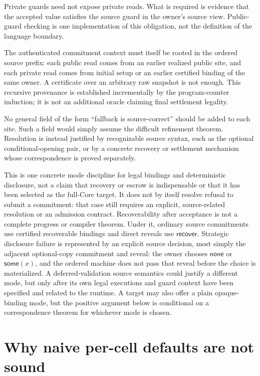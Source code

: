 \documentclass[11pt]{article}
\newcommand{\Some}{\mathsf{some}}
\newcommand{\None}{\mathsf{none}}
\begin{document}
Private guards need not expose private reads.  What is required is evidence
that the accepted value satisfies the source guard in the owner's source view.
Public-guard checking is one implementation of this obligation, not the
definition of the language boundary.

The authenticated commitment context must itself be rooted in the ordered
source prefix: each public read comes from an earlier realized public site, and
each private read comes from initial setup or an earlier certified binding of
the same owner.  A certificate over an arbitrary raw snapshot is not enough.
This recursive provenance is established incrementally by the program-counter
induction; it is not an additional oracle claiming final settlement legality.

No general field of the form ``fallback is source-correct'' should be added to
each site.  Such a field would simply assume the difficult refinement theorem.
Resolution is instead justified by recognizable source syntax, such as the
optional conditional-opening pair, or by a concrete recovery or settlement
mechanism whose correspondence is proved separately.

This is one concrete mode discipline for legal bindings and deterministic
disclosure, not a claim that recovery or escrow is indispensable or that it has
been selected as the full-Core target.  It does not by itself resolve refusal
to submit a commitment: that case still requires an explicit, source-related
resolution or an admission contract.  Recoverability after acceptance is not
a complete progress or compiler theorem.
Under it, ordinary source commitments use certified recoverable bindings and
direct reveals use $\mathsf{recover}$.  Strategic disclosure failure is
represented by an explicit source decision, most simply the adjacent
optional-copy commitment and reveal: the owner chooses $\None$ or $\Some(x)$,
and the ordered machine does not pass that reveal before the choice is
materialized.  A deferred-validation source semantics could justify a
different mode, but only after its own legal executions and guard context have
been specified and related to the runtime.  A target may also offer a plain
opaque-binding mode, but the positive argument below is conditional on a
correspondence theorem for whichever mode is chosen.

\section{Why naive per-cell defaults are not sound}
\end{document}
